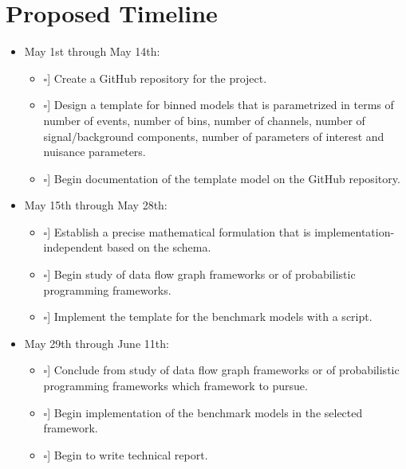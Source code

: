 \newcommand{\checkedBox}{\makebox[0pt][l]{$\square$}\raisebox{.15ex}{\hspace{0.1em}$\checkmark$}}
\newcommand{\uncheckedBox}{\makebox[0pt][l]{$\square$}\raisebox{.15ex}{\hspace{0.1em}\phantom{$\checkmark$}}}

\section{Proposed Timeline}

\begin{itemize}
	\item May 1st through May 14th:
	      \begin{itemize}
	      	\item [\uncheckedBox] Create a GitHub repository for the project.
	      	\item [\uncheckedBox] Design a template for binned models that is parametrized in terms of number of events, number of bins, number of channels, number of signal/background components, number of parameters of interest and nuisance parameters.
	      	\item [\uncheckedBox] Begin documentation of the template model on the GitHub repository.
	      \end{itemize}
	\item May 15th through May 28th:
	      \begin{itemize}
	      	\item [\uncheckedBox] Establish a precise mathematical formulation that is implementation-independent based on the  schema.
	      	\item [\uncheckedBox] Begin study of data flow graph frameworks or of probabilistic programming frameworks.
	      	\item [\uncheckedBox] Implement the template for the benchmark models with a  script.
	      \end{itemize}
	\item May 29th through June 11th:
	      \begin{itemize}
	      	\item [\uncheckedBox] Conclude from study of data flow graph frameworks or of probabilistic programming frameworks which framework to pursue.
	      	\item [\uncheckedBox] Begin implementation of the benchmark models in the selected framework.
	      	\item [\uncheckedBox] Begin to write technical report.

\end{itemize}
\end{itemize}
